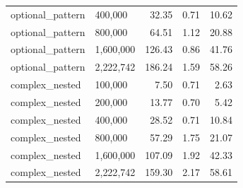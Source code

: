 {\begin{longtable}{>{\ttfamily}llrrr}
optional\_pattern & 400{,}000 & 32.35 & 0.71 & 10.62 \\
optional\_pattern & 800{,}000 & 64.51 & 1.12 & 20.88 \\
optional\_pattern & 1{,}600{,}000 & 126.43 & 0.86 & 41.76 \\
optional\_pattern & 2{,}222{,}742 & 186.24 & 1.59 & 58.26 \\
\midrule
complex\_nested & 100{,}000 & 7.50 & 0.71 & 2.63 \\
complex\_nested & 200{,}000 & 13.77 & 0.70 & 5.42 \\
complex\_nested & 400{,}000 & 28.52 & 0.71 & 10.84 \\
complex\_nested & 800{,}000 & 57.29 & 1.75 & 21.07 \\
complex\_nested & 1{,}600{,}000 & 107.09 & 1.92 & 42.33 \\
complex\_nested & 2{,}222{,}742 & 159.30 & 2.17 & 58.61 \\
\end{longtable}
}

